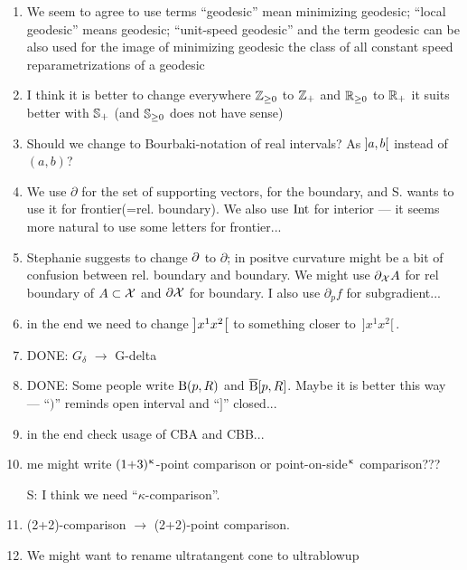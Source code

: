 \begin{enumerate}
\item We seem to agree to use terms
``geodesic'' mean minimizing geodesic;
``local geodesic'' means geodesic;
``unit-speed geodesic'' and the term geodesic can be also used for
 the image of minimizing geodesic
the class of all constant speed reparametrizations of a geodesic 

\item I think it is better to change everywhere $\ZZ_{\ge0}$ to $\mathbb{Z}_+$ and $\RR_{\ge0}$ to $\mathbb{R}_+$ it suits better with $\mathbb{S}_+$ (and $\SS_{\ge0}$ does not have sense)

\item Should we change to Bourbaki-notation of real intervals? As $\hskip-0.1em\left]a,b\right[$ instead of $(a,b)$?

\item We use $\partial$ for the set of supporting vectors, for the boundary, and S. wants to use it for frontier(=rel. boundary). We also use $\mathop{\rm Int}\nolimits$ for interior --- it seems more natural to use some letters for frontier...

\item Stephanie suggests to change $\partial$ to $\partial$; in positve curvature might be  a bit of confusion between rel. boundary and boundary. We might use $\partial_{\mathcal{X}}A$ for rel boundary of $A\subset \spc{X}$ and $\partial\mathcal{X}$ for boundary. I also use $\partial_p f$ for subgradient...

\item in the end we need to change $\hskip-0.1em\left]x^1x^2\right[$ to something closer to 
$\,{]}x^1x^2{[}\,$.

\item DONE: $G_\delta$ $\to$ G-delta

\item DONE: Some people write $\mathrm{B}{}(p,R)$ and $\overline{\mathrm{B}}{}[p,R]$. 
Maybe it is better this way --- ``$)$'' reminds open interval and ``$]$'' closed...

\item in the end check usage of CBA and CBB...

\item me might write $(1{+}3)^{\upkappa}$-point comparison or point-on-side${}^{\upkappa}$ comparison???

S: I think we need   ``$\kappa$-comparison''.

\item (2+2)-comparison $\to$ (2+2)-point comparison.

\item We might want to rename ultratangent cone to ultrablowup


\end{enumerate}

